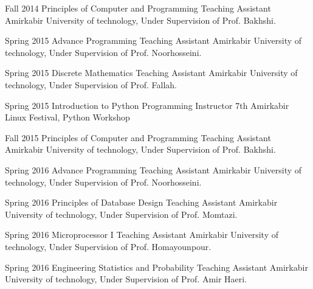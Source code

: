 \documentclass[]{friggeri-cv} %
\begin{document}
\begin{entrylist}

	\entry
	{Fall 2014}
	{Principles of Computer and Programming}
	{Teaching Assistant}
	{Amirkabir University of technology, Under Supervision of Prof. Bakhshi.}


	\entry
	{Spring 2015}
	{Advance Programming}
	{Teaching Assistant}
	{Amirkabir University of technology, Under Supervision of Prof. Noorhosseini.}


	\entry
	{Spring 2015}
	{Discrete Mathematics}
	{Teaching Assistant}
	{Amirkabir University of technology, Under Supervision of Prof. Fallah.}


	\entry
	{Spring 2015}
	{Introduction to Python Programming}
	{Instructor}
	{7th Amirkabir Linux Festival, Python Workshop}


	\entry
	{Fall 2015}
	{Principles of Computer and Programming}
	{Teaching Assistant}
	{Amirkabir University of technology, Under Supervision of Prof. Bakhshi.}


	\entry
	{Spring 2016}
	{Advance Programming}
	{Teaching Assistant}
	{Amirkabir University of technology, Under Supervision of Prof. Noorhosseini.}


	\entry
	{Spring 2016}
	{Principles of Database Design}
	{Teaching Assistant}
	{Amirkabir University of technology, Under Supervision of Prof. Momtazi.}


	\entry
	{Spring 2016}
	{Microprocessor I}
	{Teaching Assistant}
	{Amirkabir University of technology, Under Supervision of Prof. Homayounpour.}


	\entry
	{Spring 2016}
	{Engineering Statistics and Probability}
	{Teaching Assistant}
	{Amirkabir University of technology, Under Supervision of Prof. Amir Haeri.}



\end{entrylist}
\end{document}

